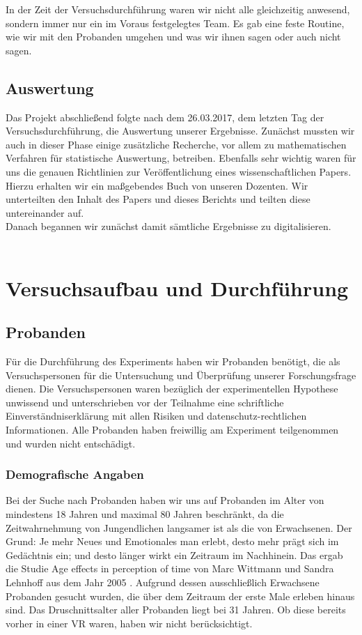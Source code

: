 \documentclass{Bericht}
\begin{document}
		In der Zeit der Versuchsdurchführung waren wir nicht alle gleichzeitig anwesend, sondern immer nur ein im Voraus festgelegtes Team. Es gab eine feste Routine, wie wir mit den Probanden umgehen und was wir ihnen sagen oder auch nicht sagen. 
		
	\subsection{Auswertung} %
	
		Das Projekt abschließend folgte nach dem 26.03.2017, dem letzten Tag der Versuchsdurchführung, die Auswertung unserer Ergebnisse.
		Zunächst mussten wir auch in dieser Phase einige zusätzliche Recherche, vor allem zu mathematischen Verfahren für statistische Auswertung, betreiben. Ebenfalls sehr wichtig waren für uns die genauen Richtlinien zur Veröffentlichung eines wissenschaftlichen Papers. Hierzu erhalten wir ein maßgebendes Buch von unseren Dozenten. Wir unterteilten den Inhalt des Papers und dieses Berichts und teilten diese untereinander auf.\\
		Danach begannen wir zunächst damit sämtliche Ergebnisse zu digitalisieren.\\
\\
\clearpage
\section{Versuchsaufbau und Durchführung} %
	
	\subsection{Probanden}
Für die Durchführung des Experiments haben wir Probanden benötigt, die als Versuchspersonen für die Untersuchung und Überprüfung unserer Forschungsfrage dienen. 
Die Versuchspersonen waren bezüglich der experimentellen Hypothese unwissend und unterschrieben vor der Teilnahme eine schriftliche Einverständniserklärung mit allen Risiken und datenschutz-rechtlichen Informationen. Alle Probanden haben freiwillig am Experiment teilgenommen und wurden nicht entschädigt. 

\subsubsection{Demografische Angaben}

Bei der Suche nach Probanden haben wir uns auf Probanden im Alter von mindestens 18 Jahren und maximal 80 Jahren beschränkt, da die Zeitwahrnehmung von Jungendlichen langsamer ist als die von Erwachsenen. Der Grund: Je mehr Neues und Emotionales man erlebt, desto mehr prägt sich im Gedächtnis ein; und desto länger wirkt ein Zeitraum im Nachhinein. Das ergab die Studie \glqq Age effects in perception of time\grqq{} von Marc Wittmann und Sandra Lehnhoff aus dem Jahr 2005 \cite{AgeEffects}. Aufgrund dessen ausschließlich Erwachsene Probanden gesucht wurden, die über dem Zeitraum der \glqq erste Male erleben\grqq{} hinaus sind. Das Druschnittsalter aller Probanden liegt bei 31 Jahren. Ob diese bereits vorher in einer VR waren, haben wir nicht berücksichtigt.
\end{document}

